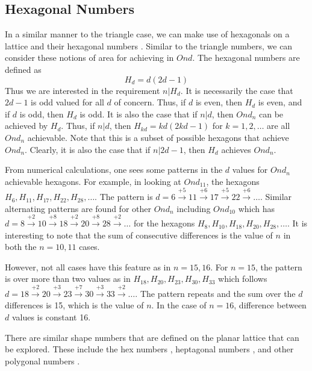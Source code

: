 \documentclass[11pt,reqno]{amsart}
\theoremstyle{mydef}
\begin{document}
\subsection{Hexagonal Numbers}

In a similar manner to the triangle case, we can make use of hexagonals on a lattice and 
their hexagonal numbers  \cite{HexagonalNumbers}. Similar to the triangle numbers, we
can consider these notions of area for achieving in $Ond$. The hexagonal numbers are
defined as 
\[
	H_d = d(2d - 1)
\]
Thus we are interested in the requirement $n \vert H_d$. It is necessarily the case that $2d - 1$ is 
odd valued for all $d$ of concern. Thus, if $d$ is even, then $H_d$ is even, and if $d$ is odd, then
$H_d$ is odd. It is also the case that if $n \vert d$, then $Ond_n$ can be achieved by $H_d$. Thus,
if $n \vert d$, then $H_{kd} = kd(2kd - 1)$ for $k = 1, 2, \ldots$ are all $Ond_n$ achievable. Note that 
this is a subset of possible hexagons that achieve $Ond_n$. Clearly, it is also the case that if $n \vert
2d - 1$, then $H_d$ achieves $Ond_n$. 

From numerical calculations, one sees some patterns in the $d$ values for $Ond_n$ achievable
hexagons. For example, in looking at $Ond_{11}$, the hexagons $H_{6}, H_{11}, H_{17}, H_{22}, H_{28}, \ldots$.
The pattern is $d = 6 \xrightarrow{+5} 11 \xrightarrow{+6} 17 \xrightarrow{+5} 22 \xrightarrow{+6} \ldots$.
Similar alternating patterns are found for other $Ond_n$ including $Ond_{10}$ which has 
$d = 8 \xrightarrow{+2} 10 \xrightarrow{+8} 18 \xrightarrow{+2} 20 \xrightarrow{+8}  28 \xrightarrow{+2} \ldots$ for the hexagons
$H_{8}, H_{10}, H_{18}, H_{20}, H_{28}, \ldots$. It is interesting to note that the sum of consecutive differences
is the value of $n$ in both the $n = 10, 11$ cases.

However, not all cases have this feature as in $n = 15, 16$. For $n = 15$, the pattern is over more
than two values  as in $H_{18}, H_{20}, H_{23}, H_{30}, H_{33}$ which follows 
$d = 18 \xrightarrow{+2} 20 \xrightarrow{+3} 23 \xrightarrow{+7} 30 \xrightarrow{+3} 33 \xrightarrow{+2} \ldots$. The pattern repeats and the sum
over the $d$ differences is 15, which is the value of $n$. In the case of $n = 16$, difference between $d$ values is constant 16.

There are similar shape numbers that are defined on the planar lattice that can be explored. These include the 
hex numbers \cite{HexNum}, heptagonal numbers \cite{Hepta}, and other polygonal numbers \cite{Polyg}.
\end{document}
